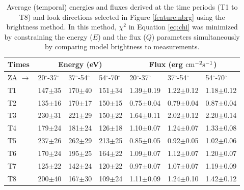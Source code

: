 \documentclass[crop=false,class=mitthesis,oneside,font=12pt]{standalone}
\begin{document}
\begin{table}
	\caption{Average (temporal) energies and fluxes derived at the time periods (T1 to T8) and look directions selected in Figure \ref{feature:nbrg} using the brightness method. In this method, $\chi^2$ in Equation \ref{eq:chi} was minimized by constraining the energy ($E$) and the flux ($Q$) parameters simultaneously by comparing model brightness to measurements.}
	\begin{tabular}{|l|l|l|l|l|l|l|}
		\hline
		Times& \multicolumn{3}{c|}{Energy (eV)} & \multicolumn{3}{c|}{Flux (erg $\rm cm^{-2} s^{-1}$)}\\ 
		\hline
		ZA $\rightarrow$& 20$^\circ$-37$^\circ$                  & 37$^\circ$-54$^\circ$                  &54$^\circ$-70$^\circ$                &20$^\circ$-37$^\circ$               &37$^\circ$-54$^\circ$                &54$^\circ$-70$^\circ$               \\	 \hline 
		
		
		T1   &         147$\pm$35 &         170$\pm$40 &      151$\pm$34 &   1.39$\pm$0.19 &   1.22$\pm$0.12 &   1.18$\pm$0.12 \\
		T2   &         135$\pm$16 &         170$\pm$17 &      150$\pm$15 &   0.75$\pm$0.04 &   0.79$\pm$0.04 &   0.87$\pm$0.04 \\
		T3   &         230$\pm$31 &         221$\pm$29 &      150$\pm$22 &   1.64$\pm$0.11 &   2.02$\pm$0.12 &   2.20$\pm$0.14 \\
		T4   &         179$\pm$24 &         181$\pm$24 &      126$\pm$18 &   1.10$\pm$0.07 &   1.24$\pm$0.07 &   1.33$\pm$0.08 \\
		T5   &         237$\pm$26 &         262$\pm$29 &      213$\pm$25 &   0.85$\pm$0.05 &   0.92$\pm$0.05 &   1.02$\pm$0.06 \\
		T6   &         170$\pm$24 &         195$\pm$25 &      164$\pm$22 &   1.09$\pm$0.07 &   1.12$\pm$0.07 &   1.20$\pm$0.07 \\
		T7   &         125$\pm$22 &         142$\pm$24 &      120$\pm$22 &   0.97$\pm$0.07 &   1.07$\pm$0.07 &   1.19$\pm$0.09 \\
		T8   &         200$\pm$40 &         167$\pm$30 &      109$\pm$24 &   1.11$\pm$0.09 &   1.24$\pm$0.10 &   1.42$\pm$0.12 \\
		\hline
	\end{tabular}
	\label{table:efl_look}		
\end{table}

\end{document}

